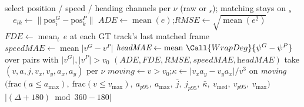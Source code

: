 \begin{algorithm}[ht]
\begin{algorithmic}[1]
  \State select position / speed / heading channels per $\nu$ (raw or $_s$); matching stays on $_s$
  \ \ $e_{ik} \gets \lVert \text{pos}^G_i - \text{pos}^P_k \rVert$ \EndFor
  \State $\textit{ADE}\gets\operatorname{mean}(e)$;\quad $\textit{RMSE}\gets\sqrt{\operatorname{mean}(e^2)}$
  \State $\textit{FDE}\gets\operatorname{mean}_t\, e$ at each GT track's last matched frame
  \State $\textit{speedMAE}\gets\operatorname{mean}\lvert v^G - v^P\rvert$
  \State $\textit{headMAE}\gets\operatorname{mean}\,\Call{WrapDeg}{\psi^G-\psi^P}$ over pairs with $\lvert v^G\rvert,\lvert v^P\rvert > v_0$
  \State \Return $(\textit{ADE},\textit{FDE},\textit{RMSE},\textit{speedMAE},\textit{headMAE})$
\EndProcedure
\Statex
{} 
  \State take $(v,a,j,v_x,v_y,a_x,a_y)$ per $\nu$ 
  \State $\textit{moving}\gets v > v_0$;\quad $\kappa \gets \lvert v_x a_y - v_y a_x\rvert / v^3$ on \textit{moving}
  \State \Return $\big(\text{frac}(a\!\le\!a_{\max}),\ \text{frac}(v\!\le\!v_{\max}),\ a_{p95},\ a_{\max},\ \bar{j},\ j_{p95},\ \bar{\kappa},\ v_{\text{med}},\ v_{p95},\ v_{\max}\big)$
\EndProcedure
\Statex
{} \Return $\lvert (\Delta+180)\bmod 360 - 180\rvert$  \EndFunction
\end{algorithmic}
\end{algorithm}
